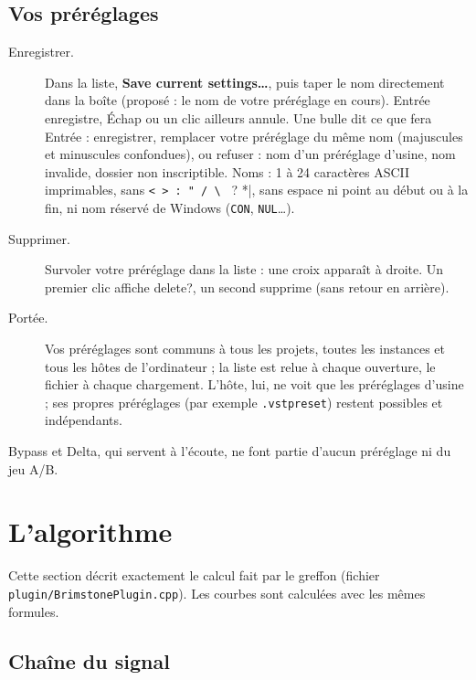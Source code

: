 \documentclass[a4paper,11pt]{article}
\newcommand{\ctl}[1]{\textsf{\textbf{#1}}}   %
\begin{document}
\subsection{Vos préréglages}
\begin{description}
\item[Enregistrer.] Dans la liste, \ctl{Save current settings\ldots}, puis taper le nom
  directement dans la boîte (proposé : le nom de votre préréglage en cours). \textsf{Entrée}
  enregistre, \textsf{Échap} ou un clic ailleurs annule. Une bulle dit ce que fera
  \textsf{Entrée} : enregistrer, remplacer votre préréglage du même nom (majuscules et minuscules
  confondues), ou refuser : nom d'un préréglage d'usine, nom invalide, dossier non inscriptible.
  Noms : 1 à 24 caractères ASCII imprimables, sans \verb|< > : " / \ | ? *|, sans espace ni point
  au début ou à la fin, ni nom réservé de Windows (\texttt{CON}, \texttt{NUL}\ldots).
\item[Supprimer.] Survoler votre préréglage dans la liste : une croix apparaît à droite. Un
  premier clic affiche \og delete?\fg, un second supprime (sans retour en arrière).
\item[Portée.] Vos préréglages sont communs à tous les projets, toutes les instances et tous les
  hôtes de l'ordinateur ; la liste est relue à chaque ouverture, le fichier à chaque chargement.
  L'hôte, lui, ne voit que les préréglages d'usine ; ses propres préréglages (par exemple
  \texttt{.vstpreset}) restent possibles et indépendants.
\end{description}
Bypass et Delta, qui servent à l'écoute, ne font partie d'aucun préréglage ni du jeu A/B.

\section{L'algorithme}

Cette section décrit exactement le calcul fait par le greffon (fichier
\nolinkurl{plugin/BrimstonePlugin.cpp}). Les courbes sont calculées avec les mêmes formules.

\subsection{Chaîne du signal}
\end{document}
